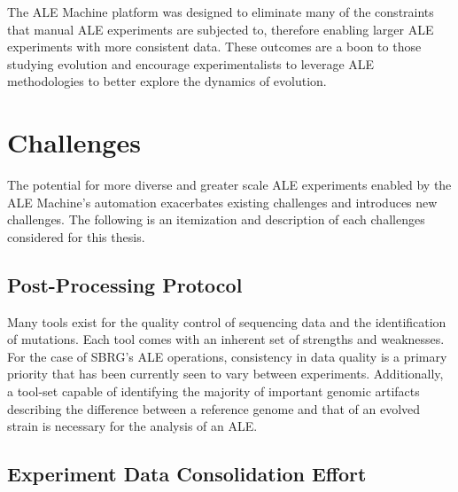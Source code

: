 \documentclass[12pt,final,masters,chapterheads]{ucsd}  %
\begin{document}
The ALE Machine platform was designed to eliminate many of the constraints that manual ALE experiments are subjected to, therefore enabling larger ALE experiments with more consistent data. These outcomes are a boon to those studying evolution and encourage experimentalists to leverage ALE methodologies to better explore the dynamics of evolution.


\section{Challenges}
% 
% 

The potential for more diverse and greater scale ALE experiments enabled by the ALE Machine's automation exacerbates existing challenges and introduces new challenges. The following is an itemization and description of each challenges considered for this thesis.

\subsection{Post-Processing Protocol}

Many tools exist for the quality control of sequencing data and the identification of mutations. Each tool comes with an inherent set of strengths and weaknesses. For the case of SBRG's ALE operations, consistency in data quality is a primary priority that has been currently seen to vary between experiments. Additionally, a tool-set capable of identifying the majority of important genomic artifacts describing the difference between a reference genome and that of an evolved strain is necessary for the analysis of an ALE.


\subsection{Experiment Data Consolidation Effort}
\end{document}
